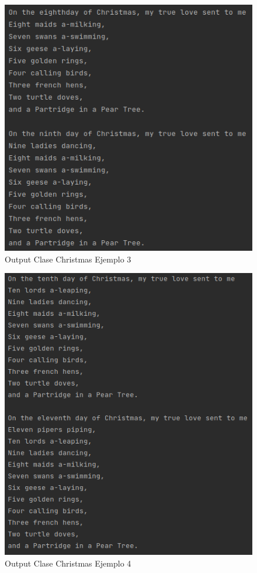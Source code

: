 \documentclass{article}
\begin{document}
\begin{figure}[H]
	\centering
	\includegraphics[scale = 0.8]{images/xmas3.png}
	\caption{Output Clase Christmas Ejemplo 3}
\end{figure}

\begin{figure}[H]
	\centering
	\includegraphics[scale = 0.8]{images/xmas4.png}
	\caption{Output Clase Christmas Ejemplo 4}
\end{figure}
\end{document}
